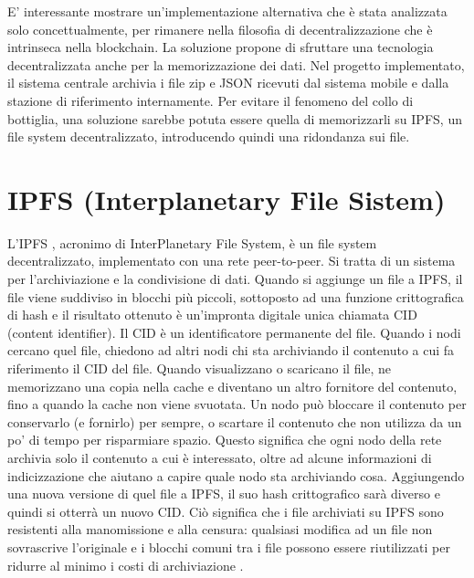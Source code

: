 E' interessante mostrare un'implementazione alternativa che è stata analizzata solo concettualmente, per rimanere nella filosofia di decentralizzazione che è intrinseca nella blockchain. La soluzione propone di sfruttare una tecnologia decentralizzata anche per la memorizzazione dei dati. Nel progetto implementato, il sistema centrale archivia i file zip e JSON ricevuti dal sistema mobile e dalla stazione di riferimento internamente. Per evitare il fenomeno del collo di bottiglia, una soluzione sarebbe potuta essere quella di memorizzarli su IPFS, un file system decentralizzato, introducendo quindi una ridondanza sui file.

\section{IPFS (Interplanetary File Sistem)}
L'IPFS \cite{ipfs_homepage}, acronimo di InterPlanetary File System, è un file system decentralizzato, implementato con una rete peer-to-peer. Si tratta di un sistema per l'archiviazione e la condivisione di dati. Quando si aggiunge un file a IPFS, il file viene suddiviso in blocchi più piccoli, sottoposto ad una funzione crittografica di hash e il risultato ottenuto è un'impronta digitale unica chiamata CID (content identifier). Il CID è un identificatore permanente del file. Quando i nodi cercano quel file, chiedono ad altri nodi chi sta archiviando il contenuto a cui fa riferimento il CID del file. Quando visualizzano o scaricano il file, ne memorizzano una copia nella cache e diventano un altro fornitore del contenuto, fino a quando la cache non viene svuotata. Un nodo può bloccare il contenuto per conservarlo (e fornirlo) per sempre, o scartare il contenuto che non utilizza da un po' di tempo per risparmiare spazio. Questo significa che ogni nodo della rete archivia solo il contenuto a cui è interessato, oltre ad alcune informazioni di indicizzazione che aiutano a capire quale nodo sta archiviando cosa. Aggiungendo una nuova versione di quel file a IPFS, il suo hash crittografico sarà diverso e quindi si otterrà un nuovo CID. Ciò significa che i file archiviati su IPFS sono resistenti alla manomissione e alla censura: qualsiasi modifica ad un file non sovrascrive l'originale e i blocchi comuni tra i file possono essere riutilizzati per ridurre al minimo i costi di archiviazione \cite{ipfs}.

